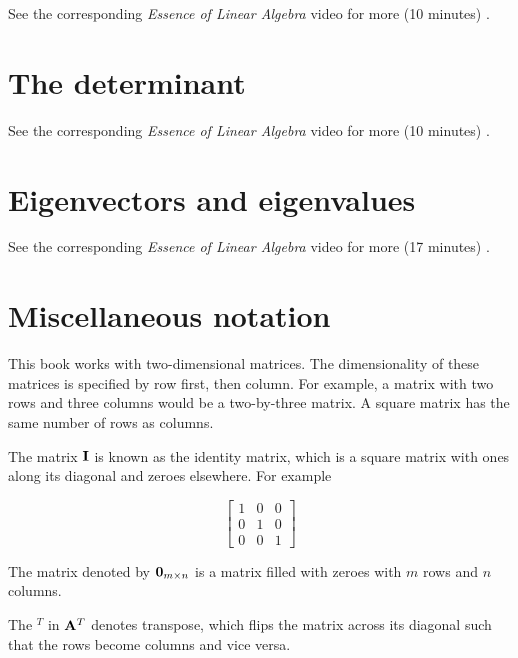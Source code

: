 \begin{remark}
  See the corresponding \textit{Essence of Linear Algebra} video for more (10
  minutes) \cite{bib:linalg_matrix_multiplication_as_composition}.
\end{remark}

\section{The determinant}

\begin{remark}
  See the corresponding \textit{Essence of Linear Algebra} video for more (10
  minutes) \cite{bib:linalg_the_determinant}.
\end{remark}

\section{Eigenvectors and eigenvalues}

\begin{remark}
  See the corresponding \textit{Essence of Linear Algebra} video for more (17
  minutes) \cite{bib:linalg_eigenvectors_and_eigenvalues}.
\end{remark}

\section{Miscellaneous notation}

This book works with two-dimensional matrices. The dimensionality of these
matrices is specified by row first, then column. For example, a matrix with two
rows and three columns would be a two-by-three matrix. A square matrix has the
same number of rows as columns.

The matrix $\mathbf{I}$ is known as the identity matrix, which is a square matrix
with ones along its diagonal and zeroes elsewhere. For example

\begin{equation*}
  \left[
  \begin{array}{ccc}
    1 & 0 & 0 \\
    0 & 1 & 0 \\
    0 & 0 & 1
  \end{array}
  \right]
\end{equation*}

The matrix denoted by $\mathbf{0}_{m \times n}$ is a matrix filled with zeroes with
$m$ rows and $n$ columns.

The $^T$ in $\mathbf{A}^T$ denotes transpose, which flips the matrix across its
diagonal such that the rows become columns and vice versa.
